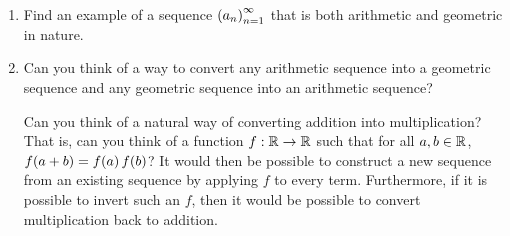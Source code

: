 \begin{boxhexercise}
\hfill
\begin{enumerate}
    \item Find an example of a sequence $\left( a_n \right)_{n=1}^{\infty}$ that is both arithmetic and geometric in nature.
    \item Can you think of a way to convert any arithmetic sequence into a geometric sequence and any geometric sequence into an arithmetic sequence?
    \begin{hint}
        Can you think of a natural way of converting addition into multiplication? That is, can you think of a function $f : \mathbb{R} \to \mathbb{R}$ such that for all $a,b \in \mathbb{R}$, $f\!\left( a + b \right) = f\!\left( a \right) f\!\left( b \right)$? It would then be possible to construct a new sequence from an existing sequence by applying $f$ to every term. Furthermore, if it is possible to invert such an $f$, then it would be possible to convert multiplication back to addition.
    \end{hint}
\end{enumerate}
\end{boxhexercise}